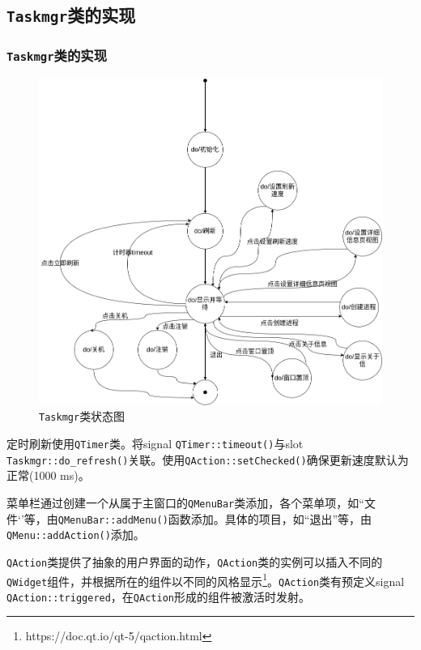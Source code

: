 \documentclass{beamer}
\newcommand\code[1]{\texttt{#1}}
\begin{document}
\subsection{\code{Taskmgr}类的实现}
\begin{frame}
    \frametitle{\code{Taskmgr}类的实现}
    \begin{figure}
        \centering
        \includegraphics[scale=0.22]{../dia/taskmgr.png}
        \caption{\code{Taskmgr}类状态图}
    \end{figure}
\end{frame}

\begin{frame}
    定时刷新使用\code{QTimer}类。将signal \code{QTimer::timeout()}与slot \code{Taskmgr::do\_refresh()}关联。使用\code{QAction::setChecked()}确保更新速度默认为正常(1000 ms)。

菜单栏通过创建一个从属于主窗口的\code{QMenuBar}类添加，各个菜单项，如``文件‘’等，由\code{QMenuBar::addMenu()}函数添加。具体的项目，如``退出''等，由\code{QMenu::addAction()}添加。

\code{QAction}类提供了抽象的用户界面的动作，\code{QAction}类的实例可以插入不同的\code{QWidget}组件，并根据所在的组件以不同的风格显示\footnote{https://doc.qt.io/qt-5/qaction.html}。\code{QAction}类有预定义signal \code{QAction::triggered}，在\code{QAction}形成的组件被激活时发射。
\end{frame}
\end{document}
